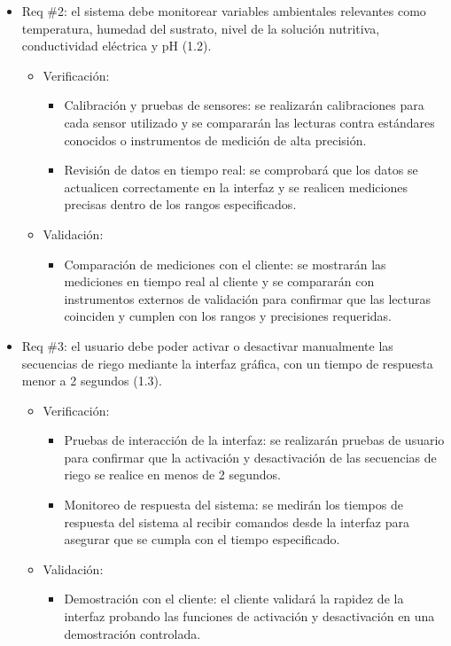 \documentclass[
11pt, %
]{charter}
\begin{document}
\begin{itemize}
\item Req \#2: el sistema debe monitorear variables ambientales relevantes como temperatura, humedad del sustrato, nivel de la solución nutritiva, conductividad eléctrica y pH (1.2).
\begin{itemize}
    \item Verificación:
    \begin{itemize}
        \item Calibración y pruebas de sensores: se realizarán calibraciones para cada sensor utilizado y se compararán las lecturas contra estándares conocidos o instrumentos de medición de alta precisión.
        \item Revisión de datos en tiempo real: se comprobará que los datos se actualicen correctamente en la interfaz y se realicen mediciones precisas dentro de los rangos especificados.
    \end{itemize}
    \item Validación:
    \begin{itemize}
        \item Comparación de mediciones con el cliente: se mostrarán las mediciones en tiempo real al cliente y se compararán con instrumentos externos de validación para confirmar que las lecturas coinciden y cumplen con los rangos y precisiones requeridas.
    \end{itemize}
\end{itemize}

\item Req \#3: el usuario debe poder activar o desactivar manualmente las secuencias de riego mediante la interfaz gráfica, con un tiempo de respuesta menor a 2 segundos (1.3).
\begin{itemize}
    \item Verificación:
    \begin{itemize}
        \item Pruebas de interacción de la interfaz: se realizarán pruebas de usuario para confirmar que la activación y desactivación de las secuencias de riego se realice en menos de 2 segundos.
        \item Monitoreo de respuesta del sistema: se medirán los tiempos de respuesta del sistema al recibir comandos desde la interfaz para asegurar que se cumpla con el tiempo especificado.
    \end{itemize}
    \item Validación:
    \begin{itemize}
        \item Demostración con el cliente: el cliente validará la rapidez de la interfaz probando las funciones de activación y desactivación en una demostración controlada.
    \end{itemize}
\end{itemize}


\end{itemize}
\end{document}
